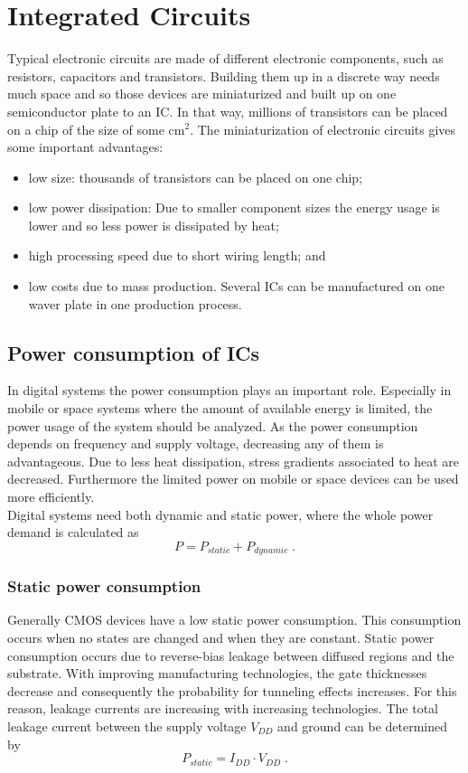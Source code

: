 \chapter{Integrated Circuits}
\label{kap:hardware}
Typical electronic circuits are made of different electronic components, such as resistors, capacitors and transistors. Building them up in a discrete way needs much space and so those devices are miniaturized and built up on one semiconductor plate to an IC. In that way, millions of transistors can be placed on a chip of the size of some cm$^2$. The miniaturization of electronic circuits gives some important advantages:
\begin{itemize}
\item low size: thousands of transistors can be placed on one chip;
\item low power dissipation: Due to smaller component sizes the energy usage is lower and so less power is dissipated by heat;
\item high processing speed due to short wiring length; and
\item low costs due to mass production. Several ICs can be manufactured on one waver plate in one production process.
\end{itemize}
\section{Power consumption of ICs}
In digital systems the power consumption plays an important role. Especially in mobile or space systems where the amount of available energy is limited, the power usage of the system should be analyzed. As the power consumption depends on frequency and supply voltage, decreasing any of them is advantageous. Due to less heat dissipation, stress gradients associated to heat are decreased. Furthermore the limited power on mobile or space devices can be used more efficiently.\\
Digital systems need both dynamic and static power, where the whole power demand is calculated as
\begin{equation}
P=P_{static}+P_{dynamic}\;.
\end{equation}
\subsection{Static power consumption}
Generally CMOS devices have a low static power consumption. This consumption occurs when no states are changed and when they are constant. Static power consumption occurs due to reverse-bias leakage between diffused regions and the substrate.\cite{Sar97} With improving manufacturing technologies, the gate thicknesses decrease and consequently the probability for tunneling effects increases. For this reason, leakage currents are increasing with increasing technologies.\cite{Iye10} The total leakage current between the supply voltage $V_{DD}$ and ground can be determined by
\begin{equation}
P_{static}=I_{DD}\cdot V_{DD}\;.
\end{equation}
